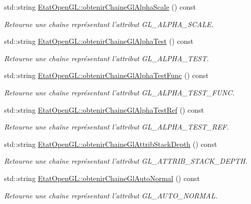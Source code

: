 \begin{DoxyCompactItemize}
std\-::string \hyperlink{group__utilitaire_ga3b85b93cd7e5d1f12a225f28ece00696}{Etat\-Open\-G\-L\-::obtenir\-Chaine\-Gl\-Alpha\-Scale} () const 
\begin{DoxyCompactList}\small\item\em Retourne une chaîne représentant l'attribut G\-L\-\_\-\-A\-L\-P\-H\-A\-\_\-\-S\-C\-A\-L\-E. \end{DoxyCompactList}\item 
std\-::string \hyperlink{group__utilitaire_ga9fd2e2270997cf027e38f6a7b8d621a8}{Etat\-Open\-G\-L\-::obtenir\-Chaine\-Gl\-Alpha\-Test} () const 
\begin{DoxyCompactList}\small\item\em Retourne une chaîne représentant l'attribut G\-L\-\_\-\-A\-L\-P\-H\-A\-\_\-\-T\-E\-S\-T. \end{DoxyCompactList}\item 
std\-::string \hyperlink{group__utilitaire_ga5002fd87fb9aede24afc4c4bb2a61fb1}{Etat\-Open\-G\-L\-::obtenir\-Chaine\-Gl\-Alpha\-Test\-Func} () const 
\begin{DoxyCompactList}\small\item\em Retourne une chaîne représentant l'attribut G\-L\-\_\-\-A\-L\-P\-H\-A\-\_\-\-T\-E\-S\-T\-\_\-\-F\-U\-N\-C. \end{DoxyCompactList}\item 
std\-::string \hyperlink{group__utilitaire_gacc2904dcf7edec91f24e5e6ea58a780c}{Etat\-Open\-G\-L\-::obtenir\-Chaine\-Gl\-Alpha\-Test\-Ref} () const 
\begin{DoxyCompactList}\small\item\em Retourne une chaîne représentant l'attribut G\-L\-\_\-\-A\-L\-P\-H\-A\-\_\-\-T\-E\-S\-T\-\_\-\-R\-E\-F. \end{DoxyCompactList}\item 
std\-::string \hyperlink{group__utilitaire_ga59c1e206aa477f625b5499cf328f695b}{Etat\-Open\-G\-L\-::obtenir\-Chaine\-Gl\-Attrib\-Stack\-Depth} () const 
\begin{DoxyCompactList}\small\item\em Retourne une chaîne représentant l'attribut G\-L\-\_\-\-A\-T\-T\-R\-I\-B\-\_\-\-S\-T\-A\-C\-K\-\_\-\-D\-E\-P\-T\-H. \end{DoxyCompactList}\item 
std\-::string \hyperlink{group__utilitaire_gaaf8d3f8a4dd51812950c32268c8f77c5}{Etat\-Open\-G\-L\-::obtenir\-Chaine\-Gl\-Auto\-Normal} () const 
\begin{DoxyCompactList}\small\item\em Retourne une chaîne représentant l'attribut G\-L\-\_\-\-A\-U\-T\-O\-\_\-\-N\-O\-R\-M\-A\-L. \end{DoxyCompactList}\item 

\end{DoxyCompactItemize}
